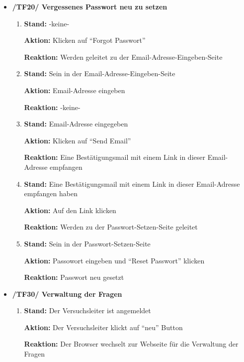 \documentclass[a4paper]{scrreprt}
\begin{document}
\begin{itemize}
                \item \textbf{/TF20/ Vergessenes Passwort neu zu setzen}
                    \begin{enumerate}
                        \item \par \textbf{Stand: }-keine-
                              \par \textbf{Aktion: }Klicken auf ``Forgot Passwort'' 
                              \par \textbf{Reaktion: }Werden geleitet zu der Email-Adresse-Eingeben-Seite
                        \item \par \textbf{Stand: }Sein in der Email-Adresse-Eingeben-Seite
                              \par \textbf{Aktion: }Email-Adresse eingeben
                              \par \textbf{Reaktion: }-keine-
                        \item \par \textbf{Stand: }Email-Adresse eingegeben
                              \par \textbf{Aktion: }Klicken auf ``Send Email''
                              \par \textbf{Reaktion: }Eine Bestätigungsmail mit einem Link in dieser Email-Adresse empfangen
                        \item \par \textbf{Stand: }Eine Bestätigungsmail mit einem Link in dieser Email-Adresse empfangen haben
                              \par \textbf{Aktion: }Auf den Link klicken
                              \par \textbf{Reaktion: }Werden zu der Passwort-Setzen-Seite geleitet
                        \item \par \textbf{Stand: }Sein in der Passwort-Setzen-Seite
                              \par \textbf{Aktion: }Passowort eingeben und ``Reset Passwort'' klicken
                              \par \textbf{Reaktion: }Passwort neu gesetzt
                    \end{enumerate}

                \item \textbf{/TF30/ Verwaltung der Fragen}

                        \begin{enumerate}
                        \item \par \textbf{Stand: } Der Versuchsleiter ist  angemeldet
                              \par \textbf{Aktion: } Der Versuchsleiter klickt auf ``neu'' Button
                              \par \textbf{Reaktion: }  Der Browser wechselt zur Webseite für die Verwaltung der Fragen


\end{enumerate}
\end{itemize}
\end{document}
